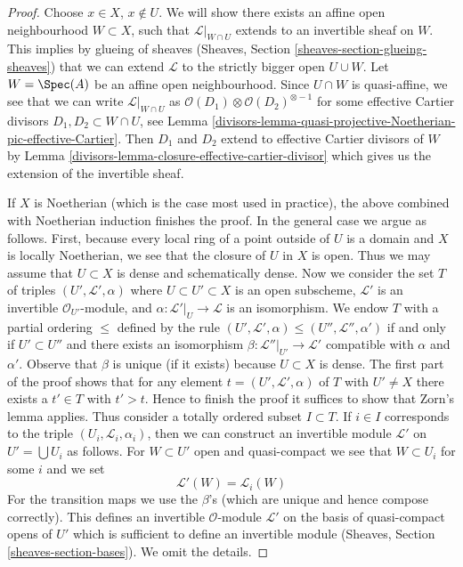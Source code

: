\begin{proof}

Choose $x \in X$, $x \not \in U$. We will show there exists an
affine open neighbourhood $W \subset X$, such that $\mathcal{L}|_{W \cap U}$
extends to an invertible sheaf on $W$. This implies by glueing of
sheaves (Sheaves, Section \ref{sheaves-section-glueing-sheaves})
that we can extend $\mathcal{L}$ to the strictly bigger open $U \cup W$.
Let $W = \Spec(A)$ be an affine open neighbourhood.
Since $U \cap W$ is quasi-affine, we see that we can write
$\mathcal{L}|_{W \cap U}$ as
$\mathcal{O}(D_1) \otimes \mathcal{O}(D_2)^{\otimes -1}$ for some
effective Cartier divisors $D_1, D_2 \subset W \cap U$, see
Lemma \ref{divisors-lemma-quasi-projective-Noetherian-pic-effective-Cartier}.
Then $D_1$ and $D_2$ extend to effective Cartier divisors of
$W$ by Lemma \ref{divisors-lemma-closure-effective-cartier-divisor}
which gives us the extension of the invertible sheaf.

\medskip\noindent
If $X$ is Noetherian (which is the case most used in practice), the above
combined with Noetherian induction finishes the proof. In the general case
we argue as follows. First, because every local ring of a point outside
of $U$ is a domain and $X$ is locally Noetherian, we see that the closure
of $U$ in $X$ is open. Thus we may assume that $U \subset X$ is dense
and schematically dense.
Now we consider the set $T$ of triples $(U', \mathcal{L}', \alpha)$
where $U \subset U' \subset X$ is an open subscheme, $\mathcal{L}'$
is an invertible $\mathcal{O}_{U'}$-module, and
$\alpha : \mathcal{L}'|_U \to \mathcal{L}$ is an isomorphism.
We endow $T$ with a partial ordering $\leq$ defined by the rule
$(U', \mathcal{L}', \alpha) \leq (U'', \mathcal{L}'', \alpha')$
if and only if $U' \subset U''$ and there exists an isomorphism
$\beta : \mathcal{L}''|_{U'} \to \mathcal{L}'$ compatible with
$\alpha$ and $\alpha'$. Observe that $\beta$ is unique (if it exists)
because $U \subset X$ is dense. The first part of the proof shows that
for any element $t = (U', \mathcal{L}', \alpha)$ of $T$ with $U' \not = X$
there exists a $t' \in T$ with $t' > t$. Hence to finish the proof it
suffices to show that Zorn's lemma applies. Thus consider a
totally ordered subset $I \subset T$. If $i \in I$ corresponds to
the triple $(U_i, \mathcal{L}_i, \alpha_i)$, then we can construct
an invertible module $\mathcal{L}'$ on $U' = \bigcup U_i$ as follows.
For $W \subset U'$ open and quasi-compact we see that
$W \subset U_i$ for some $i$ and we set
$$
\mathcal{L}'(W) = \mathcal{L}_i(W)
$$
For the transition maps we use the $\beta$'s (which are unique and hence
compose correctly). This defines an invertible $\mathcal{O}$-module
$\mathcal{L}'$ on the basis of quasi-compact opens of $U'$ which is sufficient
to define an invertible module (Sheaves, Section \ref{sheaves-section-bases}).
We omit the details.
\end{proof}

